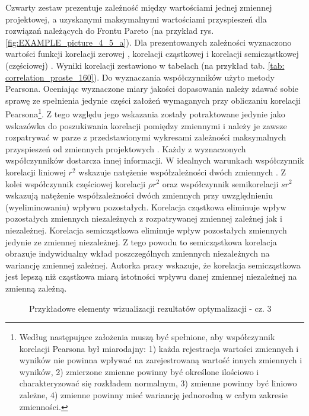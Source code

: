 Czwarty zestaw prezentuje zależność między wartościami jednej zmiennej projektowej, a uzyskanymi maksymalnymi wartościami przyspieszeń dla rozwiązań należących do Frontu Pareto (na przykład rys. \ref{fig:EXAMPLE_picture_4_5_a}). Dla prezentowanych zależności wyznaczono wartości funkcji korelacji zerowej , korelacji cząstkowej  i korelacji semicząstkowej (częściowej)  \parencite{Tabachnick}. Wyniki korelacji zestawiono w tabelach (na przykład tab. \ref{tab: correlation_proste_160}). Do wyznaczania współczynników użyto metody Pearsona. Oceniając wyznaczone miary jakości dopasowania należy zdawać sobie sprawę ze spełnienia jedynie części założeń wymaganych przy obliczaniu korelacji Pearsona\footnote{
	Według \cite{Warner2012} następujące założenia muszą być spełnione, aby współczynnik korelacji Pearsona był miarodajny: 1) każda rejestracja wartości zmiennych i wyników nie powinna wpływać na zarejestrowaną wartość innych zmiennych i wyników, 2) zmierzone zmienne powinny być określone ilościowo i charakteryzować się rozkładem normalnym, 3) zmienne powinny być liniowo zależne, 4) zmienne powinny mieć wariancję jednorodną w całym zakresie zmienności.}.
Z tego względu jego wskazania zostały potraktowane jedynie jako wskazówka do poszukiwania korelacji pomiędzy zmiennymi i należy je zawsze rozpatrywać w parze z przedstawionymi wykresami zależności maksymalnych przyspieszeń od zmiennych projektowych \parencite{Vargha2013}. Każdy z wyznaczonych współczynników dostarcza innej informacji. W idealnych warunkach współczynnik korelacji liniowej $r^2$ wskazuje natężenie współzależności dwóch zmiennych \parencite{Czaja2000}. Z kolei współczynnik częściowej korelacji $\rho r^2$ oraz współczynnik semikorelacji $sr^2$ wskazują natężenie współzależności dwóch zmiennych przy uwzględnieniu (wyeliminowaniu) wpływu pozostałych. Korelacja cząstkowa eliminuje wpływ pozostałych zmiennych niezależnych z rozpatrywanej zmiennej zależnej jak i niezależnej. Korelacja semicząstkowa eliminuje wpływ pozostałych zmiennych jedynie ze zmiennej niezależnej. Z tego powodu to semicząstkowa korelacja obrazuje indywidualny wkład poszczególnych zmiennych niezależnych na wariancję zmiennej zależnej. Autorka pracy \cite{Tabachnick} wskazuje, że korelacja semicząstkowa jest lepszą niż cząstkowa miarą istotności wpływu danej zmiennej niezależnej na zmienną zależną.
\begin{figure}[hbt!]
	\centering
	\captionsetup{justification=centering}
	\caption{Przykładowe elementy wizualizacji rezultatów optymalizacji - cz. 3}
	\label{fig:EXAMPLE_picture_4_5}
\end{figure}



